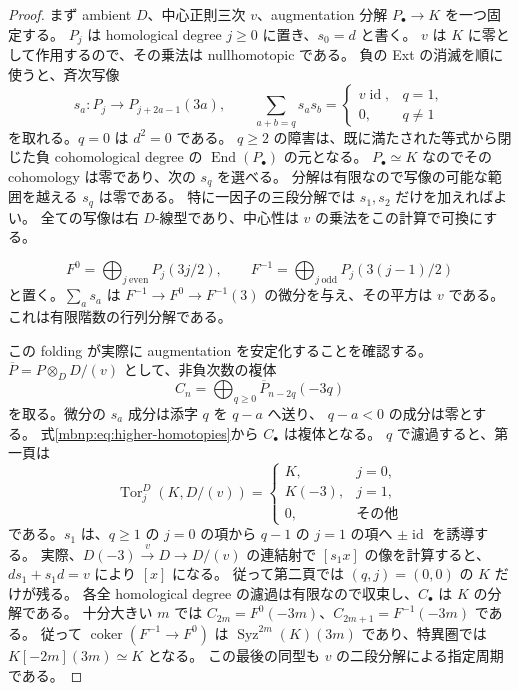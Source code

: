 \begin{proof}
まず ambient $D$、中心正則三次 $v$、augmentation 分解
$P_\bullet\to K$ を一つ固定する。
$P_j$ は homological degree $j\geq0$ に置き、$s_0=d$ と書く。
$v$ は $K$ に零として作用するので、その乗法は nullhomotopic である。
負の Ext の消滅を順に使うと、斉次写像
\begin{equation}\label{mbnp:eq:higher-homotopies}
 s_a:P_j\longrightarrow P_{j+2a-1}(3a),\qquad
 \sum_{a+b=q}s_as_b=
 \begin{cases}v\operatorname{id},&q=1,\\0,&q\ne1\end{cases}
\end{equation}
を取れる。$q=0$ は $d^2=0$ である。
$q\geq2$ の障害は、既に満たされた等式から閉じた負 cohomological degree の
$\operatorname{End}(P_\bullet)$ の元となる。
$P_\bullet\simeq K$ なのでその cohomology は零であり、次の $s_q$ を選べる。
分解は有限なので写像の可能な範囲を越える $s_q$ は零である。
特に一因子の三段分解では $s_1,s_2$ だけを加えればよい。
全ての写像は右 $D$-線型であり、中心性は $v$ の乗法をこの計算で可換にする。

\begin{equation}\label{mbnp:eq:fold}
 F^0=\bigoplus_{j\ \mathrm{even}}P_j(3j/2),\qquad
 F^{-1}=\bigoplus_{j\ \mathrm{odd}}P_j(3(j-1)/2)
\end{equation}
と置く。$\sum_as_a$ は
$F^{-1}\to F^0\to F^{-1}(3)$ の微分を与え、その平方は $v$ である。
これは有限階数の行列分解である。

この folding が実際に augmentation を安定化することを確認する。
$\overline P=P\otimes_DD/(v)$ として、非負次数の複体
\begin{equation}\label{mbnp:eq:shamash-resolution}
 C_n=\bigoplus_{q\geq0}\overline P_{n-2q}(-3q)
\end{equation}
を取る。微分の $s_a$ 成分は添字 $q$ を $q-a$ へ送り、
$q-a<0$ の成分は零とする。
式\eqref{mbnp:eq:higher-homotopies}から $C_\bullet$ は複体となる。
$q$ で濾過すると、第一頁は
\[
 \operatorname{Tor}^{D}_j(K,D/(v))=
 \begin{cases}K,&j=0,\\K(-3),&j=1,\\0,&\text{その他}\end{cases}
\]
である。$s_1$ は、$q\geq1$ の $j=0$ の項から $q-1$ の $j=1$ の項へ
$\pm\operatorname{id}$ を誘導する。
実際、$D(-3)\xrightarrow{v}D\to D/(v)$ の連結射で
$[s_1x]$ の像を計算すると、$ds_1+s_1d=v$ により $[x]$ になる。
従って第二頁では $(q,j)=(0,0)$ の $K$ だけが残る。
各全 homological degree の濾過は有限なので収束し、$C_\bullet$ は $K$ の分解である。
十分大きい $m$ では
$C_{2m}=F^0(-3m)$、$C_{2m+1}=F^{-1}(-3m)$ である。
従って $\operatorname{coker}(F^{-1}\to F^0)$ は
$\operatorname{Syz}^{2m}(K)(3m)$ であり、特異圏では
$K[-2m](3m)\simeq K$ となる。
この最後の同型も $v$ の二段分解による指定周期である。


\end{proof}
